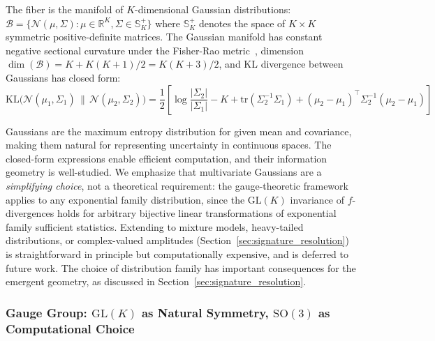 \documentclass[11pt]{article}
\begin{document}
The fiber is the manifold of $K$-dimensional Gaussian distributions: $\mathcal{B} = \{\mathcal{N}(\mu, \Sigma) : \mu \in \mathbb{R}^K, \Sigma \in \mathbb{S}^+_K\}$ where $\mathbb{S}^+_K$ denotes the space of $K \times K$ symmetric positive-definite matrices. The Gaussian manifold has constant negative sectional curvature under the Fisher-Rao metric~\cite{Amari2016}, dimension $\dim(\mathcal{B}) = K + K(K+1)/2 = K(K+3)/2$, and KL divergence between Gaussians has closed form:
\begin{equation}
\mathrm{KL}\big(\mathcal{N}(\mu_1,\Sigma_1) \,\|\, \mathcal{N}(\mu_2,\Sigma_2)\big) = \frac{1}{2}\left[\log\frac{|\Sigma_2|}{|\Sigma_1|} - K + \mathrm{tr}(\Sigma_2^{-1}\Sigma_1) + (\mu_2-\mu_1)^\top\Sigma_2^{-1}(\mu_2-\mu_1)\right]
\end{equation}

Gaussians are the maximum entropy distribution for given mean and covariance, making them natural for representing uncertainty in continuous spaces. The closed-form expressions enable efficient computation, and their information geometry is well-studied. We emphasize that multivariate Gaussians are a \emph{simplifying choice}, not a theoretical requirement: the gauge-theoretic framework applies to any exponential family distribution, since the $\mathrm{GL}(K)$ invariance of $f$-divergences holds for arbitrary bijective linear transformations of exponential family sufficient statistics. Extending to mixture models, heavy-tailed distributions, or complex-valued amplitudes (Section~\ref{sec:signature_resolution}) is straightforward in principle but computationally expensive, and is deferred to future work. The choice of distribution family has important consequences for the emergent geometry, as discussed in Section~\ref{sec:signature_resolution}.

\subsubsection{Gauge Group: $\mathrm{GL}(K)$ as Natural Symmetry, $\mathrm{SO}(3)$ as Computational Choice}
\label{sec:gauge_group_choice}
\end{document}
